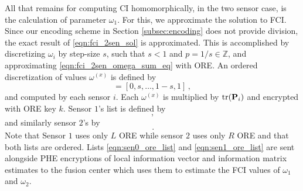 \documentclass[letterpaper, 10 pt, conference]{ieeeconf}  %
\begin{document}
All that remains for computing CI homomorphically, in the two sensor case, is the calculation of parameter $\omega_1$. For this, we approximate the solution to FCI. Since our encoding scheme in Section \ref{subsec:encoding} does not provide division, the exact result of \eqref{eqn:fci_2sen_sol} is approximated. This is accomplished by discretizing $\omega_i$ by step-size $s$, such that $s<1$ and $p=1/s \in \mathbb{Z}$, and approximating \eqref{eqn:fci_2sen_omega_sum_eq} with ORE. An ordered discretization of values $\omega^{(x)}$ is defined by
\begin{equation}
   [\omega^{(1)},\dots,\omega^{(p)}] = [0,s,\dots,1-s,1]\,,
\end{equation}
and computed by each sensor $i$. Each $\omega^{(x)}$ is multiplied by $\operatorname{tr}({{\mathbf{P}}}_i)$ and encrypted with ORE key $k$. Sensor $1$'s list is defined by 
\begin{equation}
   [\mathcal{E}^L_{ORE}(\omega^{(1)}\tr(\mP_1)),\dots,\mathcal{E}^L_{ORE}(\omega^{(p)}\tr(\mP_1))]\,, \label{eqn:sen0_ore_list}
\end{equation}
and similarly sensor $2$'s by
\begin{equation}
   [\mathcal{E}^R_{ORE}(\omega^{(1)}\tr(\mP_2)),\dots,\mathcal{E}^R_{ORE}(\omega^{(p)}\tr(\mP_2))]\,. \label{eqn:sen1_ore_list}
\end{equation}
Note that Sensor $1$ uses only $L$ ORE while sensor $2$ uses only $R$ ORE and that both lists are ordered. Lists \eqref{eqn:sen0_ore_list} and \eqref{eqn:sen1_ore_list} are sent alongside PHE encryptions of local information vector and information matrix estimates to the fusion center which uses them to estimate the FCI values of $\omega_1$ and $\omega_2$.
\end{document}
